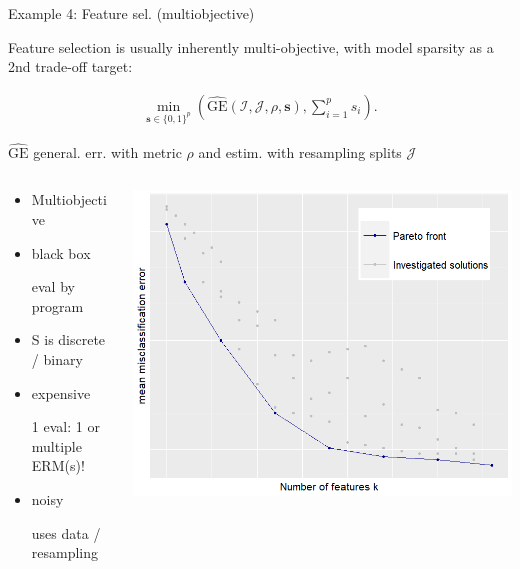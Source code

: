 \documentclass[11pt,compress,t,notes=noshow, xcolor=table]{beamer}
\begin{document}
\begin{vbframe}{Example 4: Feature sel. (multiobjective)}

Feature selection is usually inherently multi-objective,
with model sparsity as a 2nd trade-off target:

  \begin{eqnarray*}
    \min_{\textbf{s} \in \{0, 1\}^p} \left(\widehat{\text{GE}}(\mathcal{I}, \mathcal{J}, \rho, \bm{s}), \sum\nolimits_{i = 1}^p s_i\right). 
\end{eqnarray*}

$\widehat{\text{GE}}$ general. err. with metric $\rho$ and estim. with resampling splits $\mathcal{J}$ 


\begin{columns}
\begin{column}{0.4\textwidth}
\begin{itemize}
\item Multiobjective
\item black box \\
\begin{footnotesize}eval by program\end{footnotesize}
\item S is discrete / binary
\item expensive \\
\begin{footnotesize}
1 eval: 1 or multiple ERM(s)!
\end{footnotesize}
\item noisy \\
\begin{footnotesize}
uses data / resampling
\end{footnotesize}
\end{itemize}
\end{column}
\begin{column}{0.5\textwidth}
\begin{center}
\includegraphics{figure_man/pareto.png}
\end{center}
\end{column}
\end{columns}

\end{vbframe}
\end{document}
